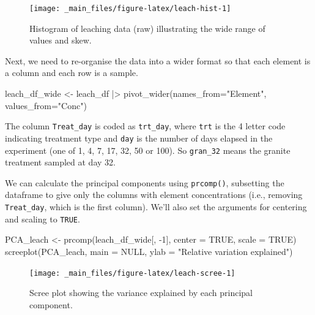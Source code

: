 \documentclass[
  11pt,
  a4paper,
]{book}
\newenvironment{Shaded}{\begin{snugshade}}{\end{snugshade}}
\newcommand{\AttributeTok}[1]{\textcolor[rgb]{0.77,0.63,0.00}{#1}}
\newcommand{\ConstantTok}[1]{\textcolor[rgb]{0.00,0.00,0.00}{#1}}
\newcommand{\DecValTok}[1]{\textcolor[rgb]{0.00,0.00,0.81}{#1}}
\newcommand{\FunctionTok}[1]{\textcolor[rgb]{0.00,0.00,0.00}{#1}}
\newcommand{\NormalTok}[1]{#1}
\newcommand{\OtherTok}[1]{\textcolor[rgb]{0.56,0.35,0.01}{#1}}
\newcommand{\SpecialCharTok}[1]{\textcolor[rgb]{0.00,0.00,0.00}{#1}}
\newcommand{\StringTok}[1]{\textcolor[rgb]{0.31,0.60,0.02}{#1}}
\begin{document}
\begin{figure}

{\centering \texttt{[image: \_main\_files/figure-latex/leach-hist-1]} 

}

\caption{Histogram of leaching data (raw) illustrating the wide range of values and skew.}\label{fig:leach-hist}
\end{figure}

Next, we need to re-organise the data into a wider format so that each element is a column and each row is a sample.

\begin{Shaded}
\begin{Highlighting}[]
\NormalTok{leach\_df\_wide }\OtherTok{\textless{}{-}}\NormalTok{ leach\_df }\SpecialCharTok{|\textgreater{}}
  \FunctionTok{pivot\_wider}\NormalTok{(}\AttributeTok{names\_from=}\StringTok{"Element"}\NormalTok{, }\AttributeTok{values\_from=}\StringTok{"Conc"}\NormalTok{)}
\end{Highlighting}
\end{Shaded}

The column \texttt{Treat\_day} is coded as \texttt{trt\_day}, where \texttt{trt} is the 4 letter code indicating treatment type and \texttt{day} is the number of days elapsed in the experiment (one of 1, 4, 7, 17, 32, 50 or 100). So \texttt{gran\_32} means the granite treatment sampled at day 32.

We can calculate the principal components using \texttt{prcomp()}, subsetting the dataframe to give only the columns with element concentrations (i.e., removing \texttt{Treat\_day}, which is the first column). We'll also set the arguments for centering and scaling to \texttt{TRUE}.

\begin{Shaded}
\begin{Highlighting}[]
\NormalTok{PCA\_leach }\OtherTok{\textless{}{-}} \FunctionTok{prcomp}\NormalTok{(leach\_df\_wide[, }\SpecialCharTok{{-}}\DecValTok{1}\NormalTok{], }\AttributeTok{center =} \ConstantTok{TRUE}\NormalTok{, }\AttributeTok{scale =} \ConstantTok{TRUE}\NormalTok{) }
\FunctionTok{screeplot}\NormalTok{(PCA\_leach, }\AttributeTok{main =} \ConstantTok{NULL}\NormalTok{, }\AttributeTok{ylab =} \StringTok{"Relative variation explained"}\NormalTok{)}
\end{Highlighting}
\end{Shaded}

\begin{figure}

{\centering \texttt{[image: \_main\_files/figure-latex/leach-scree-1]} 

}

\caption{Scree plot showing the variance explained by each principal component.}\label{fig:leach-scree}
\end{figure}
\end{document}
